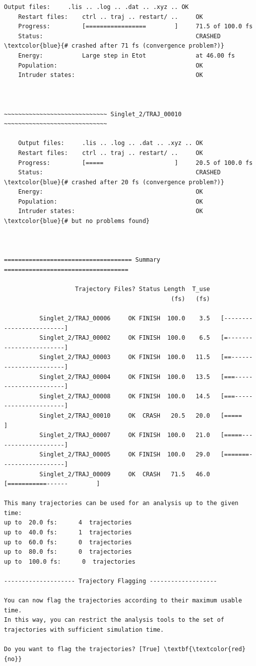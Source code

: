 \documentclass[a4paper,11pt,DIV=15,openany]{scrbook}
\begin{document}
\begin{oframed}
\begin{Verbatim}[commandchars=\\\{\}]
    Output files:     .lis .. .log .. .dat .. .xyz .. OK
    Restart files:    ctrl .. traj .. restart/ ..     OK
    Progress:         [=================        ]     71.5 of 100.0 fs
    Status:                                           CRASHED    \textcolor{blue}{# crashed after 71 fs (convergence problem?)}
    Energy:           Large step in Etot              at 46.00 fs
    Population:                                       OK
    Intruder states:                                  OK



~~~~~~~~~~~~~~~~~~~~~~~~~~~~~ Singlet_2/TRAJ_00010 ~~~~~~~~~~~~~~~~~~~~~~~~~~~~~

    Output files:     .lis .. .log .. .dat .. .xyz .. OK
    Restart files:    ctrl .. traj .. restart/ ..     OK
    Progress:         [=====                    ]     20.5 of 100.0 fs
    Status:                                           CRASHED    \textcolor{blue}{# crashed after 20 fs (convergence problem?)}
    Energy:                                           OK
    Population:                                       OK
    Intruder states:                                  OK   \textcolor{blue}{# but no problems found}



==================================== Summary ===================================

                    Trajectory Files? Status Length  T_use
                                               (fs)   (fs)

          Singlet_2/TRAJ_00006     OK FINISH  100.0    3.5   [-------------------------]
          Singlet_2/TRAJ_00002     OK FINISH  100.0    6.5   [=------------------------]
          Singlet_2/TRAJ_00003     OK FINISH  100.0   11.5   [==-----------------------]
          Singlet_2/TRAJ_00004     OK FINISH  100.0   13.5   [===----------------------]
          Singlet_2/TRAJ_00008     OK FINISH  100.0   14.5   [===----------------------]
          Singlet_2/TRAJ_00010     OK  CRASH   20.5   20.0   [=====                    ]
          Singlet_2/TRAJ_00007     OK FINISH  100.0   21.0   [=====--------------------]
          Singlet_2/TRAJ_00005     OK FINISH  100.0   29.0   [=======------------------]
          Singlet_2/TRAJ_00009     OK  CRASH   71.5   46.0   [===========------        ]

This many trajectories can be used for an analysis up to the given time:
up to  20.0 fs:      4  trajectories
up to  40.0 fs:      1  trajectories
up to  60.0 fs:      0  trajectories
up to  80.0 fs:      0  trajectories
up to  100.0 fs:      0  trajectories

-------------------- Trajectory Flagging -------------------

You can now flag the trajectories according to their maximum usable time.
In this way, you can restrict the analysis tools to the set of trajectories with sufficient simulation time.

Do you want to flag the trajectories? [True] \textbf{\textcolor{red}{no}}

\end{Verbatim}
\end{oframed}
\end{document}
